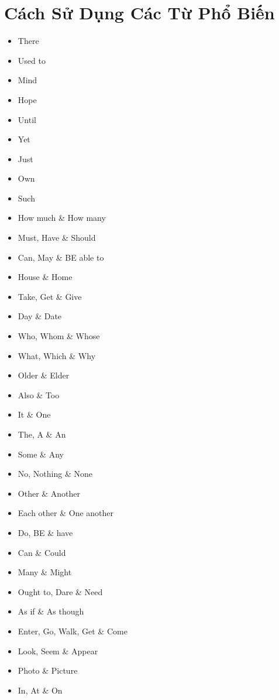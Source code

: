 \chapter{Cách Sử Dụng Các Từ Phổ Biến}
\begin{multicols*}{2}
    \begin{itemize}
        \item There
        \item Used to
        \item Mind
        \item Hope
        \item Until
        \item Yet
        \item Just
        \item Own
        \item Such
        \item How much \& How many
        \item Must, Have \& Should
        \item Can, May \& BE able to
        \item House \& Home
        \item Take, Get \& Give
        \item Day \& Date
        \item Who, Whom \& Whose
        \item What, Which \& Why
        \item Older \& Elder
        \item Also \& Too
        \item It \& One
        \item The, A \& An
        \item Some \& Any
        \item No, Nothing \& None
        \item Other \& Another
        \item Each other \& One another
        \item Do, BE \& have
        \item Can \& Could
        \item Many \& Might
        \item Ought to, Dare \& Need
        \item As if \& As though
        \item Enter, Go, Walk, Get \& Come
        \item Look, Seem \& Appear
        \item Photo \& Picture
        \item In, At \& On

\end{itemize}
\end{multicols*}
